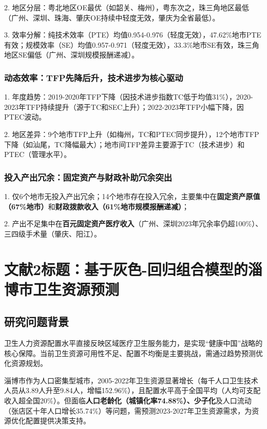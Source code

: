 \documentclass{MathNoteCN}
\begin{document}
2. 地区分层：粤北地区OE最优（如韶关、梅州），粤东次之，珠三角地区最低（广州、深圳、珠海、肇庆OE持续中轻度无效，肇庆为全省最低）\cite{chen2025}。  

3. 效率分解：纯技术效率（PTE）均值0.954-0.976（轻度无效），47.62\%地市PTE有效；规模效率（SE）均值0.957-0.971（轻度无效），33.3\%地市SE有效，珠三角地区SE偏低（广州、深圳规模报酬递减）\cite{chen2025}。

\subsubsection{动态效率：TFP先降后升，技术进步为核心驱动}
1. 年度趋势：2019-2020年TFP下降（因技术进步指数TC低于均值31\%），2020-2023年TFP持续提升（源于TC和SEC上升）；2022-2023年TFP小幅下降，因PTEC波动\cite{chen2025}。

2. 地区差异：9个地市TFP上升（如梅州，TC和PTEC同步提升），12个地市TFP下降（如汕尾，TC降幅最大）；地市间TFP差异主要源于TC（技术进步）和PTEC（管理水平）\cite{chen2025}。

\subsubsection{投入产出冗余：固定资产与财政补助冗余突出}
1. 仅6个地市无投入产出冗余；14个地市存在投入冗余，主要集中在\textbf{固定资产原值（67\%地市）}和\textbf{财政拨款收入（61\%地市规模报酬递减）}；

2. 产出不足集中在\textbf{百元固定资产医疗收入}（广州、深圳2023年冗余率仍超100\%）、三四级手术量（肇庆、阳江）\cite{chen2025}。


\section{文献2标题：基于灰色-回归组合模型的淄博市卫生资源预测}

\subsection{研究问题背景}
卫生人力资源配置水平直接反映区域医疗卫生服务能力，是实现“健康中国”战略的核心保障。当前卫生资源可用性不足、配置不均衡是主要挑战，需通过趋势预测优化资源规划\cite{wang2025}。

淄博市作为人口密集型城市，2005-2022年卫生资源显著增长（每千人口卫生技术人员从3.89人升至9.84人，增幅152.96\%），且配置水平高于全国平均（人均可支配收入超全国20\%）\cite{wang2025}。但面临\textbf{人口老龄化（城镇化率74.88\%）、少子化}及人口流动（张店区十年人口增长35.74\%）等问题，需预测2023-2027年卫生资源需求，为资源优化配置提供决策支持\cite{wang2025}。
\end{document}
